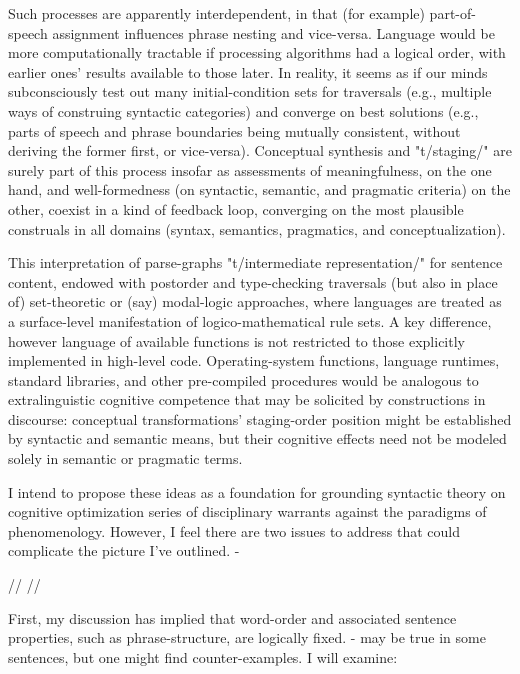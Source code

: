 Such processes are apparently interdependent, in that (for example) 
part-of-speech assignment influences phrase nesting and vice-versa.  
Language would be more computationally tractable if processing algorithms 
had a logical order, with earlier ones'  
results available to those later.  In reality, 
it seems as if our minds subconsciously test out many 
initial-condition sets for traversals (e.g., multiple ways 
of construing syntactic categories) and converge on best solutions 
(e.g., parts of speech and phrase boundaries 
being mutually consistent, without deriving the former first, 
or vice-versa).  Conceptual synthesis and "t/staging/" are 
surely part of this process insofar as assessments of meaningfulness, on the 
one hand, and well-formedness (on syntactic, semantic, and pragmatic criteria) 
on the other, coexist in a kind of feedback loop, converging on the most plausible 
construals in all domains (syntax, semantics, pragmatics, and conceptualization).     

This interpretation of parse-graphs %
"t/intermediate representation/" for sentence content, 
endowed with post\-order and type-checking traversals  
(but also in place of) set-theoretic or (say) modal-logic 
approaches, where languages are treated as a surface-level 
manifestation of logico-mathematical rule sets.  A key difference, 
however %
language %
of available functions is not restricted to those explicitly 
implemented in high-level code.  Operating-system functions, 
language runtimes, standard libraries, and other 
pre-compiled procedures would be analogous to extralinguistic 
cognitive competence that may be solicited by constructions 
in discourse: conceptual transformations' staging-order position 
might be established by syntactic and 
semantic means, but their cognitive effects need not be 
modeled solely in semantic or pragmatic terms.   

I intend to propose these ideas as a foundation for 
grounding syntactic theory on cognitive optimization 
series of disciplinary warrants against the paradigms 
of phenomenology.  However, I feel there are two 
issues to address that could complicate the picture 
I've outlined.  -%


// //

First, my discussion has implied that word-order and associated 
sentence properties, such as phrase-structure, are logically 
fixed.  -%
may be true in some sentences, but one might find 
counter-examples.  I will examine:

